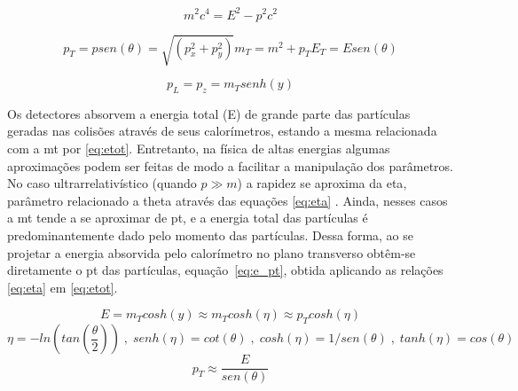 \begin{equation}\label{eq:rel_mom}
m^2c^4 = E^2 - p^2c^2
\end{equation}

\begin{subequations}\label{eq:proj_transv}
\begin{equation}\label{eq:pt}
p_T = p sen ( \theta ) = \sqrt{(p_x^2 + p_y^2)}
\end{equation}
\begin{equation}\label{eq:mt}
m_T = m^2 + p_T
\end{equation}
\begin{equation}\label{eq:Et}
E_T = E sen ( \theta )
\end{equation}
\end{subequations}

\begin{equation}\label{eq:pl}
p_L = p_z = m_T senh ( y )
\end{equation}

Os detectores absorvem a energia total (E) de grande parte das partículas
geradas nas colisões através de seus calorímetros, 
estando a mesma relacionada com a \gls{mt} por \ref{eq:etot}. Entretanto, na física de 
altas energias algumas aproximações podem
ser feitas de modo a facilitar a manipulação dos parâmetros. No caso ultrarrelativístico (quando $p \gg
m$) a rapidez se aproxima da \gls{eta}, parâmetro relacionado a \gls{theta}
através das equações \ref{eq:eta} \cite{pdg_book}.
Ainda, nesses casos a \gls{mt} tende a se aproximar de
\gls{pt}, e a energia total das partículas é predominantemente dado
pelo momento das partículas. Dessa forma, ao se projetar a energia absorvida
pelo calorímetro no plano transverso obtêm-se diretamente o \gls{pt} das
partículas, equação~\ref{eq:e_pt}, obtida aplicando as relações \ref{eq:eta} em \ref{eq:etot}.

\begin{equation}\label{eq:etot}
E = m_{T}cosh(y) \approx m_{T}cosh(\eta) \approx p_{T}cosh(\eta)
\end{equation}
\begin{equation}\label{eq:eta}
\eta = -ln \left( tan\left( \frac{\theta}{2} \right) \right) \;,\; senh(\eta) =
cot(\theta) \;,\;  cosh(\eta) = 1 / sen(\theta) \;,\; tanh(\eta) = cos(\theta) 
\end{equation}
\begin{equation}\label{eq:e_pt}
p_T \approx \frac{E}{sen(\theta)}
\end{equation}

